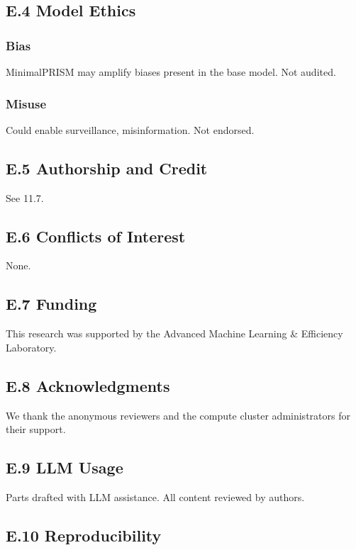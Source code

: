 \subsection{E.4 Model Ethics}

\subsubsection{Bias}

MinimalPRISM may amplify biases present in the base model. Not audited.

\subsubsection{Misuse}

Could enable surveillance, misinformation. Not endorsed.

\subsection{E.5 Authorship and Credit}

See  11.7.

\subsection{E.6 Conflicts of Interest}

None.

\subsection{E.7 Funding}

This research was supported by the Advanced Machine Learning \& Efficiency Laboratory.

\subsection{E.8 Acknowledgments}

We thank the anonymous reviewers and the compute cluster administrators for their support.

\subsection{E.9 LLM Usage}

Parts drafted with LLM assistance. All content reviewed by authors.

\subsection{E.10 Reproducibility}

